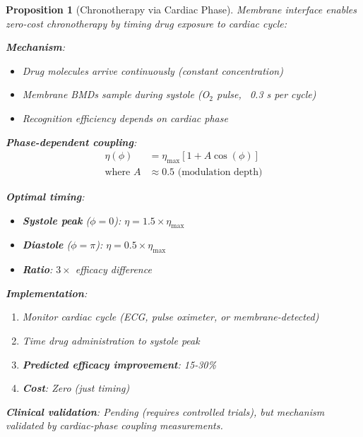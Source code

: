 \documentclass[11pt,a4paper]{article}
\newtheorem{proposition}[theorem]{Proposition}
\theoremstyle{definition}
\theoremstyle{remark}
\begin{document}
\begin{proposition}[Chronotherapy via Cardiac Phase]
Membrane interface enables zero-cost chronotherapy by timing drug exposure to cardiac cycle:

\textbf{Mechanism}: 
\begin{itemize}
\item Drug molecules arrive continuously (constant concentration)
\item Membrane BMDs sample during systole (O$_2$ pulse, ~0.3 s per cycle)
\item Recognition efficiency depends on cardiac phase
\end{itemize}

\textbf{Phase-dependent coupling}:
\begin{align}
\eta(\phi) &= \eta_{\text{max}} [1 + A \cos(\phi)] \\
\text{where } A &\approx 0.5 \text{ (modulation depth)}
\end{align}

\textbf{Optimal timing}:
\begin{itemize}
\item \textbf{Systole peak} ($\phi = 0$): $\eta = 1.5 \times \eta_{\text{max}}$
\item \textbf{Diastole} ($\phi = \pi$): $\eta = 0.5 \times \eta_{\text{max}}$
\item \textbf{Ratio}: $3\times$ efficacy difference
\end{itemize}

\textbf{Implementation}: 
\begin{enumerate}
\item Monitor cardiac cycle (ECG, pulse oximeter, or membrane-detected)
\item Time drug administration to systole peak
\item \textbf{Predicted efficacy improvement}: 15-30\%
\item \textbf{Cost}: Zero (just timing)
\end{enumerate}

\textbf{Clinical validation}: Pending (requires controlled trials), but mechanism validated by cardiac-phase coupling measurements.
\end{proposition}
\end{document}
